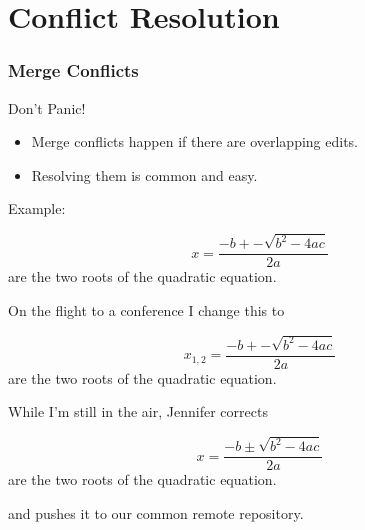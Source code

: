 \section{Conflict Resolution}


\begin{frame}[fragile]
  \frametitle{Merge Conflicts}
  
  \begin{center}
    \Large Don't Panic!
  \end{center}

  \begin{itemize}
  \item 
    Merge conflicts happen if there are overlapping edits.
  \item 
    Resolving them is common and easy.
  \end{itemize}
  
  Example:
  \begin{latexCode}
    \begin{equation}
      \label{eq:quad}
      x = \frac{-b+-\sqrt{b^2-4ac}}{2a}
    \end{equation}
    are the two roots of the quadratic equation.
  \end{latexCode}
  
\end{frame}



\begin{frame}[fragile]
  
  On the flight to a conference I change this to
  \begin{latexCode}
    \begin{equation}
      \label{eq:quad}
      x_{1,2} = \frac{-b+-\sqrt{b^2-4ac}}{2a}
    \end{equation}
    are the two roots of the quadratic equation.
  \end{latexCode}
  \bigskip
  \pause
  
  While I'm still in the air, Jennifer corrects
  \begin{latexCode}
    \begin{equation}
      \label{eq:quad}
      x = \frac{-b\pm\sqrt{b^2-4ac}}{2a}
    \end{equation}
    are the two roots of the quadratic equation.
  \end{latexCode}
  and pushes it to our common remote repository.
  
\end{frame}


